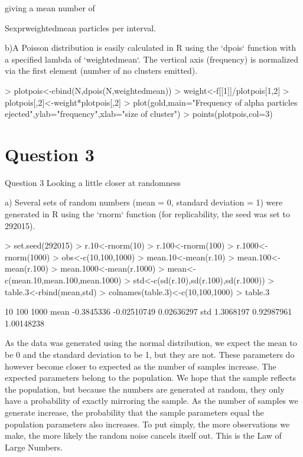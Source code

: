 \documentclass[12pt,letterpaper]{article}
\begin{document}
giving a mean number of {Sexpr{weightedmean} particles per interval.

b)A Poisson distribution is easily calculated in R using the `dpois` function with a specified lambda of `weightedmean`.  The vertical axis (frequency) is normalized via the first element (number of no clusters emitted).
\begin{Schunk}
\begin{Sinput}
> plotpois<-cbind(N,dpois(N,weightedmean))
> weight<-f[[1]]/plotpois[1,2]
> plotpois[,2]<-weight*plotpois[,2]
> plot(gold,main="Frequency of alpha particles ejected",ylab="frequency",xlab="size of cluster")
> points(plotpois,col=3)
\end{Sinput}
\end{Schunk}



\section*{Question 3}

Question 3
Looking a little closer at randomness

a)  Several sets of random numbers (mean = 0, standard deviation = 1) were generated in R using the `rnorm` function (for replicability, the seed was set to 292015).
\begin{Schunk}
\begin{Sinput}
> set.seed(292015)
> r.10<-rnorm(10)
> r.100<-rnorm(100)
> r.1000<-rnorm(1000)
> obs<-c(10,100,1000)
> mean.10<-mean(r.10)
> mean.100<-mean(r.100)
> mean.1000<-mean(r.1000)
> mean<-c(mean.10,mean.100,mean.1000)
> std<-c(sd(r.10),sd(r.100),sd(r.1000))
> table.3<-rbind(mean,std)
> colnames(table.3)<-c(10,100,1000)
> table.3
\end{Sinput}
\begin{Soutput}
             10         100       1000
mean -0.3845336 -0.02510749 0.02636297
std   1.3068197  0.92987961 1.00148238
\end{Soutput}
\end{Schunk}
As the data was generated using the normal distribution, we expect the mean to be 0 and the standard deviation to be 1, but they are not.  These parameters do however become closer to expected as the number of samples increase.  The expected parameters belong to the population.  We hope that the sample reflects the population, but because the numbers are generated at random, they only have a probability of exactly mirroring the sample.  As the number of samples we generate increase, the probability that the sample parameters equal the population parameters also increases.  To put simply, the more observations we make, the more likely the random noise cancels itself out.  This is the Law of Large Numbers.

}
\end{document}
